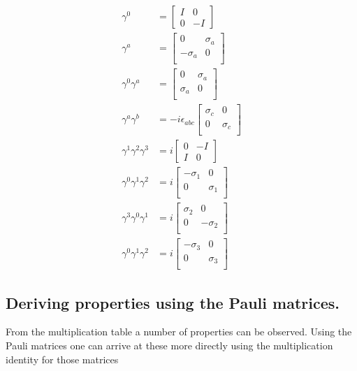 \begin{align}
\gamma^0 &= 
\begin{bmatrix}
I & 0 \\
0 & -I
\end{bmatrix} \\
\gamma^a &= 
\begin{bmatrix}
0 & \sigma_a \\
-\sigma_a & 0 \\
\end{bmatrix} \\
\gamma^0 \gamma^a &=
\begin{bmatrix}
0 & \sigma_a \\
\sigma_a & 0 \\
\end{bmatrix} \\
\gamma^a \gamma^b &=
- i \epsilon_{a b c}
\begin{bmatrix}
\sigma_c & 0 \\
0 & \sigma_c \\
\end{bmatrix} \\
\gamma^1 \gamma^2 \gamma^3 &= i 
\begin{bmatrix}
0 & -I \\
I & 0
\end{bmatrix} \\
\gamma^0 \gamma^1 \gamma^2 &= i 
\begin{bmatrix}
-\sigma_1 & 0 \\
0 & \sigma_1 \\
\end{bmatrix} \\
\gamma^3 \gamma^0 \gamma^1 &= i 
\begin{bmatrix}
\sigma_2 & 0 \\
0 & -\sigma_2 \\
\end{bmatrix} \\
\gamma^0 \gamma^1 \gamma^2 &= i 
\begin{bmatrix}
-\sigma_3 & 0 \\
0 & \sigma_3 \\
\end{bmatrix}
\end{align}

\subsection{Deriving properties using the Pauli matrices. }

From the multiplication table a number of properties can be observed.  Using the Pauli matrices one can arrive at these more directly using the multiplication identity for those
matrices

